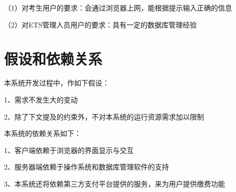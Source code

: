 （1）对考生用户的要求：会通过浏览器上网，能根据提示输入正确的信息

（2）对ETS管理人员用户的要求：具有一定的数据库管理经验

\section{假设和依赖关系}
本系统开发过程中，作如下假设：

1、需求不发生大的变动

2、除了下文提及的约束外，不对本系统的运行资源需求加以限制

本系统的依赖关系如下：

1、客户端依赖于浏览器的界面显示与交互

2、服务器端依赖于操作系统和数据库管理软件的支持

3、本系统还将依赖第三方支付平台提供的服务，来为用户提供缴费功能
